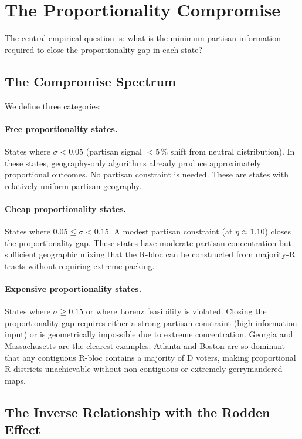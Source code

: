 \section{The Proportionality Compromise}
\label{sec:compromise}

The central empirical question is: what is the minimum partisan information
required to close the proportionality gap in each state?

\subsection{The Compromise Spectrum}

We define three categories:

\paragraph{Free proportionality states.}
States where $\sigma < 0.05$ (partisan signal $< 5\,\%$ shift from neutral
distribution). In these states, geography-only algorithms already produce
approximately proportional outcomes. No partisan constraint is needed.
These are states with relatively uniform partisan geography.

\paragraph{Cheap proportionality states.}
States where $0.05 \leq \sigma < 0.15$. A modest partisan constraint
(at $\eta \approx 1.10$) closes the proportionality gap.
These states have moderate partisan concentration but sufficient geographic
mixing that the R-bloc can be constructed from majority-R tracts without
requiring extreme packing.

\paragraph{Expensive proportionality states.}
States where $\sigma \geq 0.15$ or where Lorenz feasibility is violated.
Closing the proportionality gap requires either a strong partisan constraint
(high information input) or is geometrically impossible due to extreme
concentration. Georgia and Massachusetts are the clearest examples:
Atlanta and Boston are so dominant that any contiguous R-bloc contains
a majority of D voters, making proportional R districts unachievable
without non-contiguous or extremely gerrymandered maps.

\subsection{The Inverse Relationship with the Rodden Effect}

